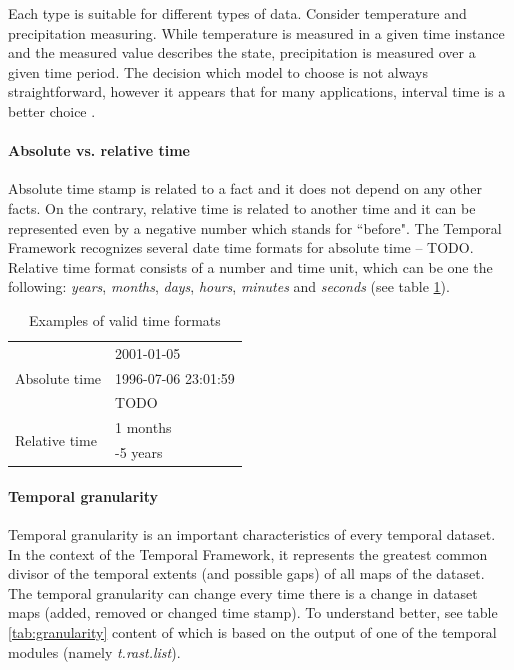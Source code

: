 \documentclass[a4paper,12pt]{book}
\newcommand{\mod}[1]{\textsl{#1}}
\newcommand{\tf}{Temporal Framework\xspace}
\begin{document}
Each type is suitable for different types of data.
Consider temperature and precipitation measuring.
While temperature is measured in a given time instance and the measured value describes the state,
precipitation is measured over a given time period. The decision which model to choose is not always
straightforward, however it appears that for many applications,
interval time is a better choice \cite{pointVsInterval}.

\paragraph{Absolute vs. relative time}
\label{sec:absoluteVsRelative}
Absolute time stamp is related to a fact and it does not depend on any other facts.
On the contrary, relative time is related to another time and
it can be represented even by a negative number which stands for ``before".
The \tf recognizes several date time formats for absolute time -- TODO.
Relative time format consists of a number and time unit, which can be one the following: \emph{years},
\emph{months}, \emph{days}, \emph{hours}, \emph{minutes} and \emph{seconds} (see table \ref{tab:timeFormat}).

\begin{table}[ht!]
  \centering
\caption{Examples of valid time formats}
\label{tab:timeFormat}
\setlength{\extrarowheight}{3pt}
\begin{tabular}{|l|l|}
\hline
\multirow{3}{*}{Absolute time}
 & 2001-01-05  \\ \cline{2-2}
 & 1996-07-06 23:01:59  \\\cline{2-2}
 & TODO  \\
 \hline
\multirow{2}{*}{Relative time}
 & 1 months  \\\cline{2-2}
 & -5 years  \\
 \hline
\end{tabular}
\end{table}

\paragraph{Temporal granularity}
\label{sec:temporalGranularity}
Temporal granularity is an important characteristics of every temporal dataset.
In the context of the \tf , it represents the greatest common divisor
of the temporal extents (and possible gaps) of all maps of the dataset.
The temporal granularity can change every time there is a change in dataset maps
(added, removed or changed time stamp).
To understand better, see table \ref{tab:granularity} content of which is based on the output
of one of the temporal modules (namely \mod{t.rast.list}).
\end{document}
